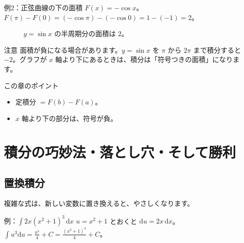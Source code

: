 \documentclass[a4paper,11pt,openany]{ltjsbook}
\newcommand{\dd}{\mathrm{d}}
\begin{document}
\begin{examplebox}{例2：正弦曲線の下の面積}
$F(x)=-\cos x$。$F(\pi)-F(0)=(-\cos\pi)-(-\cos0)=1-(-1)=2$。
\end{examplebox}

\begin{figure}[htbp]
\centering
{}
\caption{$y=\sin x$ の半周期分の面積は $2$。}
\end{figure}

\begin{notebox}{注意}
面積が負になる場合があります。$y=\sin x$ を $\pi$ から $2\pi$ まで積分すると $-2$。グラフが $x$ 軸より下にあるときは、積分は「符号つきの面積」になります。
\end{notebox}

\begin{pointbox}{この章のポイント}
\begin{itemize}[leftmargin=1.5em]
\item 定積分 $=F(b)-F(a)$。
\item $x$ 軸より下の部分は、符号が負。
\end{itemize}
\end{pointbox}

\chapter{積分の巧妙法・落とし穴・そして勝利}

\section{置換積分}

複雑な式は、新しい変数に置き換えると、やさしくなります。

\begin{examplebox}{例：$\displaystyle\int2x(x^2+1)^3\,\dd x$}
$u=x^2+1$ とおくと $\dd u=2x\,\dd x$。\quad $\displaystyle\int u^3\dd u=\frac{u^4}{4}+C=\frac{(x^2+1)^4}{4}+C$。
\end{examplebox}
\end{document}
